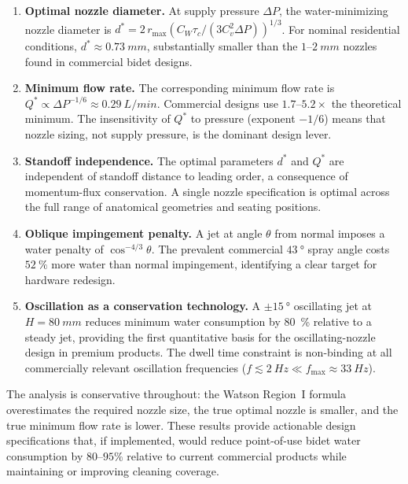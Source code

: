 \documentclass[aps,prfluids,reprint,amsmath,amssymb,floatfix]{revtex4-2}
\begin{document}
\begin{enumerate}[leftmargin=*, itemsep=4pt]
  \item \textbf{Optimal nozzle diameter.} At supply pressure $\Delta P$,
  the water-minimizing nozzle diameter is
  $d^* = 2\,r_\mathrm{max}(C_W\tau_c/(3C_v^2\Delta P))^{1/3}$.
  For nominal residential conditions, $d^* \approx \SI{0.73}{mm}$,
  substantially smaller than the $1$--$\SI{2}{mm}$ nozzles found in
  commercial bidet designs.

  \item \textbf{Minimum flow rate.} The corresponding minimum flow rate
  is $Q^* \propto \Delta P^{-1/6} \approx \SI{0.29}{L/min}$. Commercial
  designs use $1.7$--$5.2\times$ the theoretical minimum. The insensitivity
  of $Q^*$ to pressure (exponent $-1/6$) means that nozzle sizing, not
  supply pressure, is the dominant design lever.

  \item \textbf{Standoff independence.} The optimal parameters $d^*$ and
  $Q^*$ are independent of standoff distance to leading order, a consequence
  of momentum-flux conservation. A single nozzle specification is optimal
  across the full range of anatomical geometries and seating positions.

  \item \textbf{Oblique impingement penalty.} A jet at angle $\theta$
  from normal imposes a water penalty of $\cos^{-4/3}\theta$. The prevalent
  commercial $\SI{43}{\degree}$ spray angle costs $\SI{52}{\percent}$
  more water than normal impingement, identifying a clear target for
  hardware redesign.

  \item \textbf{Oscillation as a conservation technology.} A $\pm\SI{15}{\degree}$
  oscillating jet at $H = \SI{80}{mm}$ reduces minimum water consumption
  by \SI{80}{\percent} relative to a steady jet, providing the first
  quantitative basis for the oscillating-nozzle design in premium products.
  The dwell time constraint is non-binding at all commercially relevant
  oscillation frequencies ($f \lesssim \SI{2}{Hz} \ll f_\mathrm{max} \approx \SI{33}{Hz}$).
\end{enumerate}

The analysis is conservative throughout: the Watson Region~I formula
overestimates the required nozzle size, the true optimal nozzle is smaller,
and the true minimum flow rate is lower. These results provide actionable
design specifications that, if implemented, would reduce point-of-use
bidet water consumption by $80$--$95\%$ relative to current commercial
products while maintaining or improving cleaning coverage.
\end{document}
